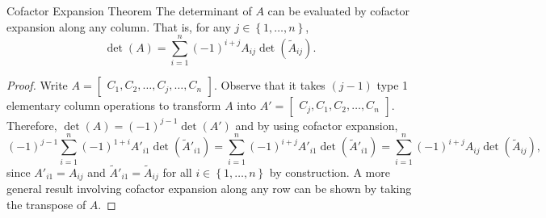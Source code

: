 \documentclass[linearalgebraI]{subfiles}
\begin{document}
    \begin{theorem}{Cofactor Expansion Theorem}
        The determinant of $A$ can be evaluated by cofactor expansion along any column. That is, for any $j\in \left\lbrace 1, \ldots, n \right\rbrace$,
        \begin{equation*}
            \det(A) = \sum^n_{i=1} (-1)^{i+j} A_{ij} \det\left( \widetilde{A}_{ij}\right).
        \end{equation*}
    \end{theorem}

    \begin{proof}
        Write $A = \begin{bmatrix} C_1,C_2,\ldots,C_j,\ldots,C_n \end{bmatrix}$. Observe that it takes $(j-1)$ type 1 elementary column operations to transform $A$ into $A' = \begin{bmatrix} C_j, C_1, C_2, \ldots, C_n \end{bmatrix}$. Therefore, $\det(A) = (-1)^{j-1}\det \left( A' \right)$ and by using cofactor expansion,
        \begin{equation*}
            (-1)^{j-1}\sum^n_{i=1} (-1)^{1+i} A'_{i1}\det \left(\widetilde{A}'_{i1}\right) = \sum^n_{i=1} (-1)^{i+j} A'_{i1}\det \left(\widetilde{A}'_{i1}\right) = \sum^n_{i=1} (-1)^{i+j} A_{ij}\det \left(\widetilde{A}_{ij}\right),
        \end{equation*}
        since $A'_{i1} = A_{ij}$ and $\widetilde{A}'_{i1} = \widetilde{A}_{ij}$ for all $i\in \left\lbrace 1, \ldots, n \right\rbrace$ by construction. A more general result involving cofactor expansion along any row can be shown by taking the transpose of $A$.
    \end{proof}
\end{document}
